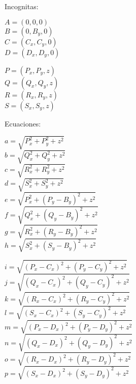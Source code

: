 \documentclass[11pt]{article}
\begin{document}
    \noindent
    Incognitas:
    \begin{multicols}{2}
    \noindent
    $A = (0, 0, 0)$\\
    $B = (0, B_y, 0)$\\
    $C = (C_x, C_y, 0)$\\
    $D = (D_x, D_y, 0)$\\
    \columnbreak
    
    \noindent
    $P = (P_x, P_y, z)$\\
    $Q = (Q_x, Q_y, z)$\\
    $R = (R_x, R_y, z)$\\
    $S = (S_x, S_y, z)$\\
    \end{multicols}
    
    \pagebreak
    \noindent
    Ecuaciones:
    \begin{multicols}{2}
    \noindent
    $a = \sqrt{P_x^2 + P_y^2 + z^2}$ \\
    $b = \sqrt{Q_x^2 + Q_y^2 + z^2}$ \\
    $c = \sqrt{R_x^2 + R_y^2 + z^2}$ \\
    $d = \sqrt{S_x^2 + S_y^2 + z^2}$ \\
    $e = \sqrt{P_x^2 + (P_y - B_y)^2 + z^2}$ \\
    $f = \sqrt{Q_x^2 + (Q_y - B_y)^2 + z^2}$ \\
    $g = \sqrt{R_x^2 + (R_y - B_y)^2 + z^2}$ \\
    $h = \sqrt{S_x^2 + (S_y - B_y)^2 + z^2}$ \\
    \columnbreak
    
    \noindent
    $i = \sqrt{(P_x - C_x)^2 + (P_y - C_y)^2 + z^2}$ \\
    $j = \sqrt{(Q_x - C_x)^2 + (Q_y - C_y)^2 + z^2}$ \\
    $k = \sqrt{(R_x - C_x)^2 + (R_y - C_y)^2 + z^2}$ \\
    $l = \sqrt{(S_x - C_x)^2 + (S_y - C_y)^2 + z^2}$ \\
    $m = \sqrt{(P_x - D_x)^2 + (P_y - D_y)^2 + z^2}$ \\
    $n = \sqrt{(Q_x - D_x)^2 + (Q_y - D_y)^2 + z^2}$ \\
    $o = \sqrt{(R_x - D_x)^2 + (R_y - D_y)^2 + z^2}$ \\
    $p = \sqrt{(S_x - D_x)^2 + (S_y - D_y)^2 + z^2}$ \\
    \end{multicols}
    
    
    
\end{document}
